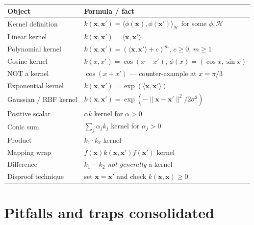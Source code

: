 \documentclass[11pt, a4paper]{article}
\newcommand{\thead}[1]{\textbf{#1}}
\begin{document}
\begin{tabularx}{\linewidth}{@{}lX@{}}
\toprule
\thead{Object} & \thead{Formula / fact} \\
\midrule
Kernel definition         & $k(\mathbf{x}, \mathbf{x}') = \langle\phi(\mathbf{x}), \phi(\mathbf{x}')\rangle_{\mathcal{H}}$ for some $\phi, \mathcal{H}$ \\
Linear kernel             & $k(\mathbf{x}, \mathbf{x}') = \langle\mathbf{x}, \mathbf{x}'\rangle$ \\
Polynomial kernel         & $k(\mathbf{x}, \mathbf{x}') = (\langle\mathbf{x}, \mathbf{x}'\rangle + c)^m$, $c \ge 0$, $m \ge 1$ \\
Cosine kernel             & $k(x, x') = \cos(x - x')$, $\phi(x) = (\cos x, \sin x)$ \\
NOT a kernel              & $\cos(x + x')$ — counter-example at $x = \pi/3$ \\
Exponential kernel        & $k(\mathbf{x}, \mathbf{x}') = \exp(\langle\mathbf{x}, \mathbf{x}'\rangle)$ \\
Gaussian / RBF kernel     & $k(\mathbf{x}, \mathbf{x}') = \exp(-\|\mathbf{x}-\mathbf{x}'\|^2 / 2\sigma^2)$ \\
Positive scalar           & $\alpha k$ kernel for $\alpha > 0$ \\
Conic sum                 & $\sum_j \alpha_j k_j$ kernel for $\alpha_j > 0$ \\
Product                   & $k_1\cdot k_2$ kernel \\
Mapping wrap              & $f(\mathbf{x})k(\mathbf{x}, \mathbf{x}')f(\mathbf{x}')$ kernel \\
Difference                & $k_1 - k_2$ \emph{not generally} a kernel \\
Disproof technique        & set $\mathbf{x} = \mathbf{x}'$ and check $k(\mathbf{x}, \mathbf{x}) \ge 0$ \\
\bottomrule
\end{tabularx}

\section*{Pitfalls and traps consolidated}
\end{document}
